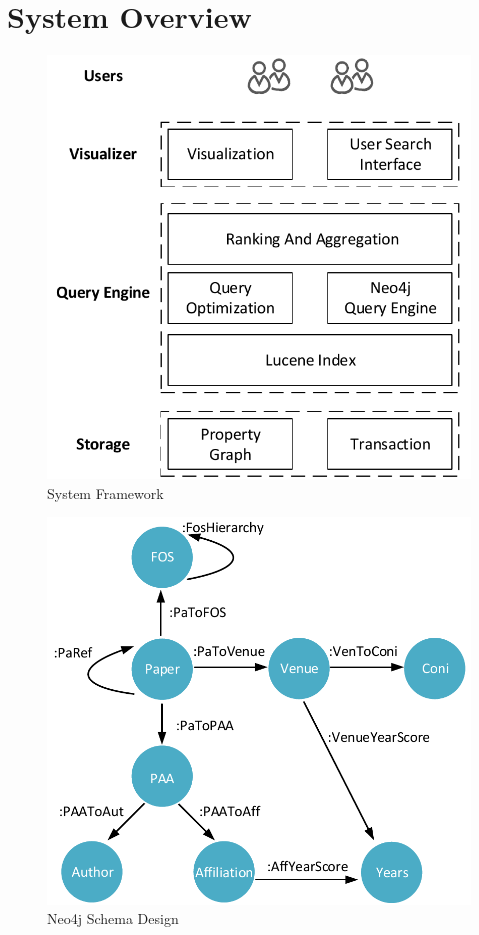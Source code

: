 \section{System Overview}
\label{sec-system}

\begin{figure}
\centering
\includegraphics[width=0.9\columnwidth]{systemFrame.pdf}
\caption{System Framework}
\label{fig:frame}
\vspace{-2ex}
\end{figure}


\begin{figure}
\centering
\includegraphics[width=0.5\columnwidth]{neo4jSchema.pdf}
\caption{Neo4j Schema Design}
\label{fig:schema}
\vspace{-3ex}
\end{figure}

